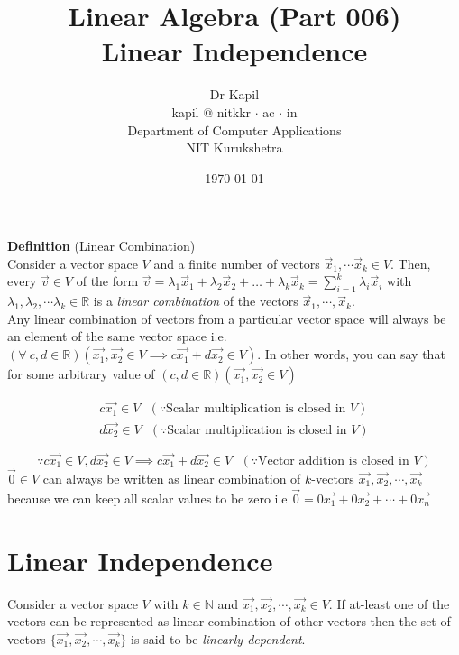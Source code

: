 \documentclass{article}
\title{Linear Algebra (Part 006)\\Linear Independence}
\author{Dr Kapil\\kapil $@$ nitkkr $\cdot$ ac $\cdot$ in\\ Department of Computer Applications\\ NIT Kurukshetra}
\date{\today}
\begin{document}
\maketitle
\thispagestyle{fancy}
\textbf{Definition}  (Linear Combination)\\
Consider a vector space $V$ and a finite number of vectors \(\vec{x}_1, \cdots \vec{x}_k \in V \). Then, every \(\vec{v} \in V\) of the form \(\vec{v} = \lambda_1\vec{x}_1 + \lambda_2\vec{x}_2 + \ldots + \lambda_k\vec{x}_k = \sum_{i=1}^{k}\lambda_i\vec{x}_i\) with $\lambda_1, \lambda_2, \cdots \lambda_k \in \mathbb{R}$ is a \textit{linear combination} of the vectors $\vec{x}_1, \cdots, \vec{x}_k$.\\

Any linear combination of vectors from a particular vector space will always be an element of the same vector space i.e.\( (\forall~c,d \in \mathbb{R}) (\vec{x_1},\vec{x_2} \in V \implies c\vec{x_1}+d\vec{x_2} \in V)\). In other words, you can say that for some arbitrary value of \((c,d \in \mathbb{R}) (\vec{x_1},\vec{x_2} \in V)\)

\begin{align}
    c \vec{x_1} \in V ~~~ (\because\text{Scalar multiplication is closed in }V) \nonumber\\
    d \vec{x_2} \in V ~~~ (\because\text{Scalar multiplication is closed in }V) \nonumber
\end{align}

\[
\because c \vec{x_1} \in V, d \vec{x_2} \in V \implies c \vec{x_1} + d \vec{x_2} \in V ~~~ (\because\text{Vector addition is closed in }V)
\]
$\vec{0} \in V$ can always be written as linear combination of $k$-vectors \begin{math}\vec{x_1}, \vec{x_2}, \cdots, \vec{x_k}\end{math} because we can keep all scalar values to be zero i.e $\vec{0} = 0\vec{x_1} + 0\vec{x_2} + \cdots + 0\vec{x_n}$

\section{Linear Independence}

Consider a vector space $V$ with $k \in \mathbb{N}$ and $\vec{x_1}, \vec{x_2}, \cdots, \vec{x_k} \in V$. If at-least one of the vectors can be represented as linear combination of other vectors then the set of vectors $\{\vec{x_1}, \vec{x_2}, \cdots, \vec{x_k}\}$ is said to be \textit{linearly dependent}.\\
\end{document}

